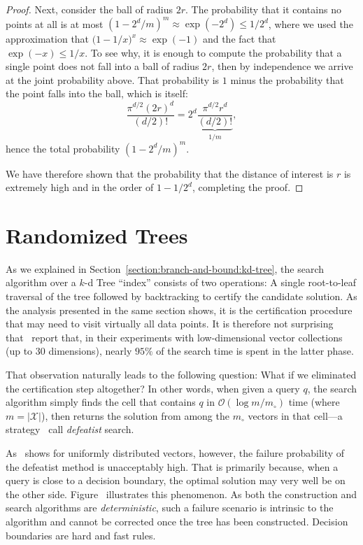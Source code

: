 \begin{proof}
    Next, consider the ball of radius $2r$. The probability that it contains no points
    at all is at most $(1 - 2^d/m)^m \approx \exp(-2^d) \leq 1/2^d$, where we used the approximation that
    $\big(1 - 1/x\big)^x \approx \exp(-1)$ and the fact that $\exp(-x) \leq 1/x$.
    To see why, it is enough to compute the probability that a single point does not fall into a
    ball of radius $2r$, then by independence we arrive at the joint probability above.
    That probability is $1$ minus the probability that the point falls into the ball,
    which is itself:
    \begin{equation*}
        \frac{\pi^{d/2} (2r)^d}{(d/2)!} = 2^d \underbrace{\frac{\pi^{d/2} r^d}{(d/2)!}}_{1/m},
    \end{equation*}
    hence the total probability $(1 - 2^d/m)^m$.

    We have therefore shown that the probability that the distance of interest is $r$
    is extremely high and in the order of $1 - 1/2^d$, completing the proof.
\end{proof}

\section{Randomized Trees}

As we explained in Section~\ref{section:branch-and-bound:kd-tree},
the search algorithm over a $k$-d Tree ``index'' consists of two operations:
A single root-to-leaf traversal of the tree followed by backtracking to certify
the candidate solution. As the analysis presented in the same section shows, it
is the certification procedure that may need to visit virtually all data points.
It is therefore not surprising that~\cite{liu2004SpillTree} report that,
in their experiments with low-dimensional vector collections (up to $30$ dimensions),
nearly $95\%$ of the search time is spent in the latter phase.

That observation naturally leads to the following question: What if we eliminated
the certification step altogether? In other words, when given a query $q$, the search
algorithm simply finds the cell that contains $q$ in $\mathcal{O}(\log m/m_\circ)$
time (where $m=\lvert \mathcal{X} \rvert$), then returns the solution
from among the $m_\circ$ vectors in that cell---a
strategy~\cite{liu2004SpillTree} call \emph{defeatist} search.

As~\cite{panigrahy2008improved-kdtree} shows for uniformly distributed vectors,
however, the failure probability of the defeatist
method is unacceptably high. That is primarily because, when a query is close to a
decision boundary, the optimal solution may very well be on the other side.
Figure~ illustrates this phenomenon.
As both the construction and search algorithms are \emph{deterministic},
such a failure scenario is intrinsic to the algorithm and
cannot be corrected once the tree has been constructed. Decision boundaries
are hard and fast rules.

